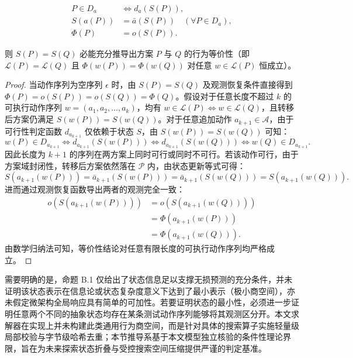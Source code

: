 \documentclass[anonymous,withtoc]{gmcm2026}
\begin{document}
\begin{equation}
\begin{aligned}
P \in D_a &\iff d_a(S(P)), \\
S(a(P)) &= \bar{a}(S(P)) \quad (\forall P \in D_a), \\
\Phi(P) &= o(S(P)).
\end{aligned}
\end{equation}

则 \(S(P) = S(Q)\) 必能充分推导出方案 \(P\) 与 \(Q\) 的行为等价性（即 \(\mathcal{L}(P) = \mathcal{L}(Q)\) 且 \(\Phi(w(P)) = \Phi(w(Q))\) 对任意 \(w \in \mathcal{L}(P)\) 恒成立）。

\begin{proof} 当动作序列为空序列 \(\epsilon\) 时，由 \(S(P) = S(Q)\) 及观测恢复条件直接得到 \(\Phi(P) = o(S(P)) = o(S(Q)) = \Phi(Q)\)。假设对于任意长度不超过 \(k\) 的可执行动作序列 \(w = (a_1, a_2, \dots, a_k)\)，均有 \(w \in \mathcal{L}(P) \iff w \in \mathcal{L}(Q)\)，且转移后方案仍满足 \(S(w(P)) = S(w(Q))\)。对于任意追加动作 \(a_{k+1} \in \mathcal{A}\)，由于可行性判定函数 \(d_{a_{k+1}}\) 仅依赖于状态 \(S\)，由 \(S(w(P)) = S(w(Q))\) 可知： \begin{equation}
w(P) \in D_{a_{k+1}} \iff d_{a_{k+1}}(S(w(P))) \iff d_{a_{k+1}}(S(w(Q))) \iff w(Q) \in D_{a_{k+1}}.
\end{equation} 因此长度为 \(k+1\) 的序列在两方案上同时可行或同时不可行。若该动作可行，由于方案域封闭性，转移后方案依然落在 \(\mathcal{P}\) 内，由状态更新等式可得： \begin{equation}
S(a_{k+1}(w(P))) = \bar{a}_{k+1}(S(w(P))) = \bar{a}_{k+1}(S(w(Q))) = S(a_{k+1}(w(Q))).
\end{equation} 进而通过观测恢复函数导出两者的观测完全一致： \begin{equation}
\begin{aligned}
o(S(a_{k+1}(w(P)))) &= o(S(a_{k+1}(w(Q)))) \\
&= \Phi(a_{k+1}(w(P))) \\
&= \Phi(a_{k+1}(w(Q))).
\end{aligned}
\end{equation} 由数学归纳法可知，等价性结论对任意有限长度的可执行动作序列均严格成立。 \end{proof}

需要明确的是，命题 B.1 仅给出了状态信息足以支撑无损预测的充分条件，并未证明该状态表示在信息论或状态复杂度意义下达到了最小表示（极小商空间），亦未假定微架构全局响应具有简单的可加性。若要证明状态的最小性，必须进一步证明任意两个不同的抽象状态均存在某条测试动作序列能够将其观测区分开。本文求解器在实现上并未构建此类通用行为商空间，而是针对具体的搜索算子实施轻量级局部校验与字节级哈希去重；本节推导系基于本文模型独立核验的条件性理论界限，旨在为未来探索状态折叠与受控搜索空间压缩提供严谨的判定基准。
\end{document}
